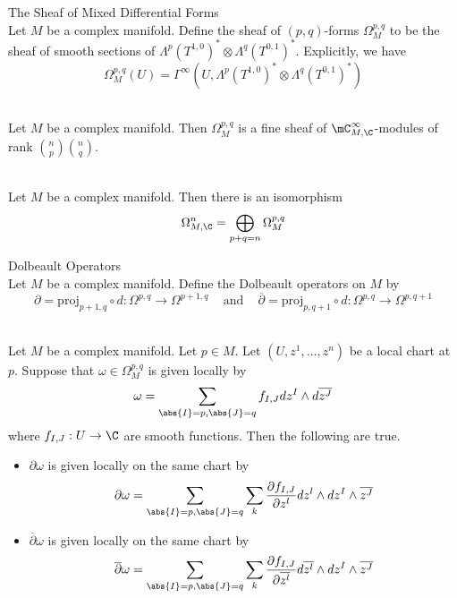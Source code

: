 \documentclass[a4paper]{article}
\begin{document}
\begin{defn}{The Sheaf of Mixed Differential Forms}{}\\
Let $M$ be a complex manifold. Define the sheaf of $(p,q)$-forms $\Omega_M^{p,q}$ to be the sheaf of smooth sections of $\Lambda^p(T^{1,0})^\ast\otimes\Lambda^q(T^{0,1})^\ast$. Explicitly, we have $$\Omega_M^{p,q}(U)=\Gamma^\infty(U,\Lambda^p(T^{1,0})^\ast\otimes\Lambda^q(T^{0,1})^\ast)$$
\end{defn}

\begin{lmm}{}{}\\
Let $M$ be a complex manifold. Then $\Omega_M^{p,q}$ is a fine sheaf of $\mC_{M,\C}^\infty$-modules of rank $\binom{n}{p}\binom{n}{q}$. 
\end{lmm}

\begin{lmm}{}{}\\
Let $M$ be a complex manifold. Then there is an isomorphism $$\Omega_{M,\C}^n=\bigoplus_{p+q=n}\Omega_M^{p,q}$$
\end{lmm}

\begin{defn}{Dolbeault Operators}{}\\
Let $M$ be a complex manifold. Define the Dolbeault operators on $M$ by $$\partial=\text{proj}_{p+1,q}\circ d:\Omega^{p,q}\to\Omega^{p+1,q}\;\;\;\text{ and }\;\;\;\overline{\partial}=\text{proj}_{p,q+1}\circ d:\Omega^{p,q}\to\Omega^{p,q+1}$$
\end{defn}

\begin{prp}{}{}\\
Let $M$ be a complex manifold. Let $p\in M$. Let $(U,z^1,\dots,z^n)$ be a local chart at $p$. Suppose that $\omega\in\Omega_M^{p,q}$ is given locally by $$\omega=\sum_{\abs{I}=p,\abs{J}=q}f_{I,J}dz^I\wedge d\overline{z^J}$$ where $f_{I,J}:U\to\C$ are smooth functions. Then the following are true. 
\begin{itemize}
\item $\partial\omega$ is given locally on the same chart by $$\partial\omega=\sum_{\abs{I}=p,\abs{J}=q}\sum_k\frac{\partial f_{I,J}}{\partial z^l}dz^l\wedge dz^I\wedge\overline{z^J}$$
\item $\overline{\partial}\omega$ is given locally on the same chart by $$\overline{\partial}\omega=\sum_{\abs{I}=p,\abs{J}=q}\sum_k\frac{\partial f_{I,J}}{\partial\overline{z^l}}d\overline{z^l}\wedge dz^I\wedge\overline{z^J}$$
\end{itemize}
\end{prp}
\end{document}
